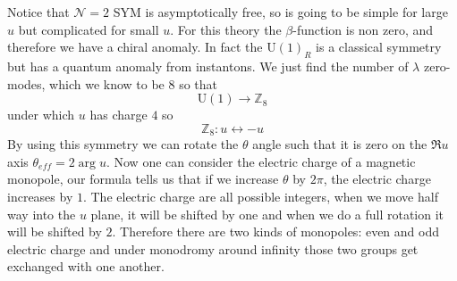 \documentclass[11pt]{article}
\theoremstyle{definition}
\numberwithin{equation}{section}
\newcommand*\cN{\mathcal{N}}
\newcommand*\bbZ{\mathbb{Z}}
\newcommand*\U{\mathrm{U}}
\begin{document}
Notice that $\cN=2$ SYM is asymptotically free, so is going to be simple for large $u$ but complicated for small $u$. For this theory the $\beta$-function is non zero, and therefore we have a chiral anomaly. In fact the $\U(1)_{R}$ is a classical symmetry but has a quantum anomaly from instantons. We just find the number of $\lambda$ zero-modes, which we know to be $8$ so that
\begin{equation}
	\U(1)\rightarrow \bbZ_{8}
\end{equation}
under which $u$ has charge $4$ so
\begin{equation}
	\bbZ_{8}:u\leftrightarrow -u
\end{equation}
By using this symmetry we can rotate the $\theta$ angle such that it is zero on the $\Re u$ axis $\theta_{eff}=2\arg{u}$. Now one can consider the electric charge of a magnetic monopole, our formula tells us that if we increase $\theta$ by $2\pi$, the electric charge increases by $1$. The electric charge are all possible integers, when we move half way into the $u$ plane, it will be shifted by one and when we do a full rotation it will be shifted by $2$. Therefore there are two kinds of monopoles: even and odd electric charge and under monodromy around infinity those two groups get exchanged with one another.
\end{document}
